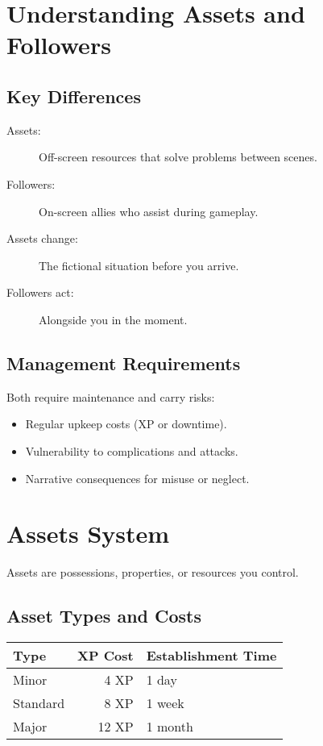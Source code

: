\documentclass[11pt,twoside,openany]{book}
\begin{document}
\section*{Understanding Assets and Followers} 

\subsection*{Key Differences}

\begin{description}
\item[Assets:] Off-screen resources that solve problems between scenes.
\item[Followers:] On-screen allies who assist during gameplay.
\item[Assets change:] The fictional situation before you arrive.
\item[Followers act:] Alongside you in the moment.
\end{description}

\subsection*{Management Requirements}

Both require maintenance and carry risks:
\begin{itemize}
\item Regular upkeep costs (XP or downtime).
\item Vulnerability to complications and attacks.
\item Narrative consequences for misuse or neglect.
\end{itemize}

\section*{Assets System} 

Assets are possessions, properties, or resources you control.

\subsection*{Asset Types and Costs}

\begin{center}
\begin{tabular}{|l|r|l|}
\hline
\textbf{Type} & \textbf{XP Cost} & \textbf{Establishment Time} \\
\hline
Minor & 4 XP & 1 day \\
Standard & 8 XP & 1 week \\
Major & 12 XP & 1 month \\
\hline
\end{tabular}
\end{center}
\end{document}
